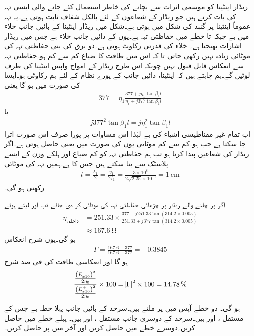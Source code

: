  ریڈار اینٹینا کو موسمی اثرات سے بچانے کی خاطر استعمال کئے جانے والی ایسی تہہ کی بات کرتے ہیں جو ریڈار کے شعاعوں کے لئے بالکل شفاف ثابت ہوتی ہے۔یہ تہہ عموماً اینٹینا پر گنبد کی شکل میں ہوتی ہے۔شکل  میں ریڈار اینٹینا  کے بائیں جانب خلاء میں ہے جبکہ  تا  خطے میں حفاظتی تہہ ہے۔یوں  کے دائیں جانب خلاء ہے جس میں ریڈار اشارات بھیجتا ہے۔ خلاء کی قدرتی رکاوٹ  ہوتی ہے۔ذو برق کی بنی حفاظتی تہہ کی موٹائی زیادہ نہیں رکھی جاتی تا کہ اس میں طاقت کا ضیاع کم سے کم ہو۔حفاظتی تہہ سے انعکاس قابل قبول نہیں چونکہ اس طرح ریڈار کے امواج واپس اینٹینا کی طرف لوٹیں گے۔ہم چاہتے ہیں کہ اینٹینا، دائیں جانب کے پورے نظام کے لئے ہم رکاوٹی ہو۔ایسا  کی صورت میں ہو گا یعنی
\begin{align*}
377=\eta_1 \frac{377+j\eta_1 \tan \beta_1 l}{\eta_1+j 377 \tan \beta_1 l}
\end{align*}
یا
\begin{align*}
j 377^2 \tan \beta_1 l =j \eta_1^2 \tan \beta_1 l
\end{align*}
اب تمام غیر مقناطیسی اشیاء کی  ہے لہٰذا اس مساوات پر پورا صرف اس صورت اترا جا سکتا ہے جب  ہو۔کم سے کم موٹائی یوں  کی صورت میں  یعنی  حاصل ہوتی ہے۔اگر ریڈار  کی شعاعیں پیدا کرتا ہو تب ہم حفاظتی تہہ کو کم ضیاع اور ہلکے وزن کے ایسے  پلاسٹک  سے بنا سکتے ہیں جس کا  ہے۔ہمیں تہہ کی موٹائی
\begin{align*}
l=\frac{\lambda_1}{2}=\frac{v_1}{2 f_1}=\frac{3\times 10^8}{2 \sqrt{2.25} \times 10^{10}}=\SI{1}{\centi\meter}
\end{align*}
رکھنی ہو گی۔

اگر  پر چلنے والے ریڈار پر چڑھائی حفاظتی تہہ کی موٹائی  کر دی جائے تب  اور  لیتے ہوئے
\begin{align*}
\eta_{\text{داخلی}}&=251.33 \times \frac{377+j 251.33 \tan (314.2 \times 0.005)}{251.33+j 377 \tan(314.2\times 0.005)}\\
&\approx \SI{167.6}{\ohm}
\end{align*}
ہو گی۔یوں شرح انعکاس
\begin{align*}
\Gamma=\frac{167.6-377}{167.6+377}=-0.3845
\end{align*}
ہو گا اور انعکاسی طاقت کی فی صد شرح
\begin{align*}
\frac{\frac{\left(E_{x10}^-\right)^2}{2\eta_0}}{\frac{\left(E_{x10}^+\right)^2}{2\eta_0}} \times 100=\abs{\Gamma}^2 \times 100=\SI{14.78}{\%}
\end{align*}
ہو گی۔
دو خطے آپس میں  پر ملتے ہیں۔سرحد کے بائیں جانب پہلا خطہ ہے جس کے مستقل ،  اور  ہیں۔سرحد کے دوسری جانب مستقل ،  اور  ہیں۔ پہلے خطے میں  حاصل کریں۔دوسرے خطے میں  حاصل کریں اور آخر میں  پر  حاصل کریں۔

